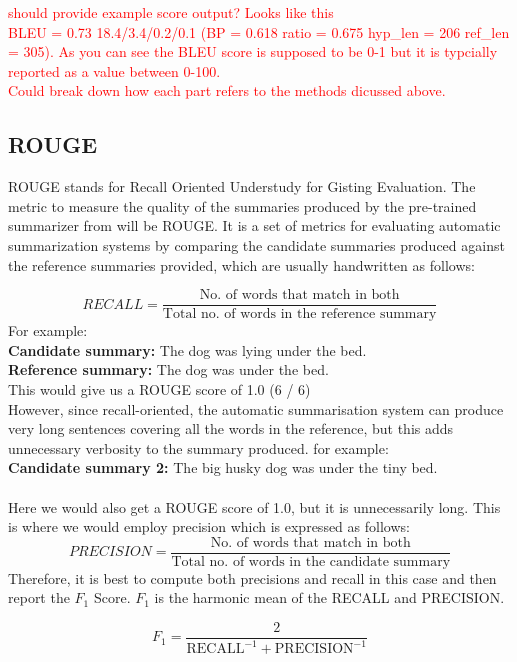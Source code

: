 \documentclass[12pt,a4paper,twoside,openright]{report}
\newcommand{\red}[1]{\textcolor{red}{#1}}
\newcommand{\changedFont}[1]{{\fontfamily{qcr}\selectfont #1}}
\begin{document}
\red{should provide example score output? Looks like this\\ BLEU = 0.73 18.4/3.4/0.2/0.1 (BP = 0.618 ratio = 0.675 hyp\_len = 206 ref\_len = 305). As you can see the BLEU score is supposed to be 0-1 but it is typcially reported as a value between 0-100.\\ Could break down how each part refers to the methods dicussed above.}


\subsection{ROUGE}
\label{rouge}

ROUGE stands for Recall Oriented Understudy for Gisting Evaluation. The metric to measure the quality of the summaries produced by the pre-trained summarizer from \cite{summary} will be ROUGE. It is a set of metrics for evaluating automatic summarization systems by comparing the candidate summaries produced against the reference summaries provided, which are usually handwritten as follows:

\[ RECALL = \frac{\text{No. of words that match in both}}{\text{Total no. of words in the reference summary}} \]
For example:\\
\textbf{Candidate summary:} \changedFont{The dog was lying under the bed.}\\
\textbf{Reference summary:} \changedFont{The dog was under the bed.}\\
This would give us a ROUGE score of 1.0 (6 / 6)\\

However, since recall-oriented, the automatic summarisation system can produce very long sentences covering all the words in the reference, but this adds unnecessary verbosity to the summary produced. for example:\\
\textbf{Candidate summary 2: } \changedFont{The big husky dog was under the tiny bed.}
\\\\
Here we would also get a ROUGE score of 1.0, but it is unnecessarily long.
This is where we would employ precision which is expressed as follows:
\[ PRECISION = \frac{\text{No. of words that match in both}}{\text{Total no. of words in the candidate summary}} \]
Therefore, it is best to compute both precisions and recall in this case and then report the $F_1$ Score. $F_1$ is the harmonic mean of the RECALL and PRECISION.

\[ F_1 = \frac{2}{\text{RECALL}^{-1} + \text{PRECISION}^{-1}} \]
\end{document}
